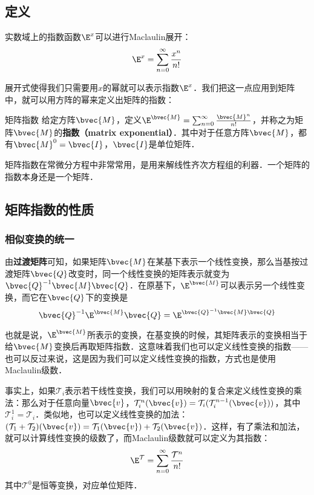 

\subsection{定义}
实数域上的指数函数$\E^x$可以进行Maclaulin展开：\begin{equation}
\E^x=\sum\limits_{n=0}^\infty \frac{x^n}{n!}
\end{equation}

展开式使得我们只需要用$x$的幂就可以表示指数$\E^x$．我们把这一点应用到矩阵中，就可以用方阵的幂来定义出矩阵的指数：

\begin{definition}{矩阵指数}
给定方阵$\bvec{M}$，定义$\E^\bvec{M}=\sum_{n=0}^\infty \frac{\bvec{M}^n}{n!}$，并称之为矩阵$\bvec{M}$的\textbf{指数（matrix exponential）}．其中对于任意方阵$\bvec{M}$，都有$\bvec{M}^0=\bvec{I}$，$\bvec{I}$是单位矩阵．
\end{definition}

矩阵指数在常微分方程中非常常用，是用来解线性齐次方程组的利器．一个矩阵的指数本身还是一个矩阵．

\subsection{矩阵指数的性质}

\subsubsection{相似变换的统一}

由\textbf{过渡矩阵}可知，如果矩阵$\bvec{M}$在某基下表示一个线性变换，那么当基按过渡矩阵$\bvec{Q}$改变时，同一个线性变换的矩阵表示就变为$\bvec{Q}^{-1}\bvec{M}\bvec{Q}$．在原基下，$\E^\bvec{M}$可以表示另一个线性变换，而它在$\bvec{Q}$下的变换是
\begin{equation}\label{MatExp_eq1}
\bvec{Q}^{-1}\E^\bvec{M}\bvec{Q}=\E^{\bvec{Q}^{-1}\bvec{M}\bvec{Q}}
\end{equation}

也就是说，$\E^\bvec{M}$所表示的变换，在基变换的时候，其矩阵表示的变换相当于给$\bvec{M}$变换后再取矩阵指数．这意味着我们也可以定义线性变换的指数——也可以反过来说，这是因为我们可以定义线性变换的指数，方式也是使用Maclaulin级数．

事实上，如果$\mathcal{T}_i$表示若干线性变换，我们可以用映射的复合来定义线性变换的乘法：那么对于任意向量$\bvec{v}$，$\mathcal{T}^n_i(\bvec{v})=\mathcal{T}_i(\mathcal{T}^{n-1}_i(\bvec{v}))$，其中$\mathcal{T}_i^1=\mathcal{T}_i$．类似地，也可以定义线性变换的加法：$(\mathcal{T}_1+\mathcal{T}_2)(\bvec{v})=\mathcal{T}_1(\bvec{v})+\mathcal{T}_2(\bvec{v})$．这样，有了乘法和加法，就可以计算线性变换的级数了，而Maclaulin级数就可以定义为其指数：
\begin{equation}
\E^\mathcal{T}=\sum\limits_{n=0}^\infty \frac{\mathcal{T}^n}{n!}
\end{equation}
其中$\mathcal{T}^0$是恒等变换，对应单位矩阵．

